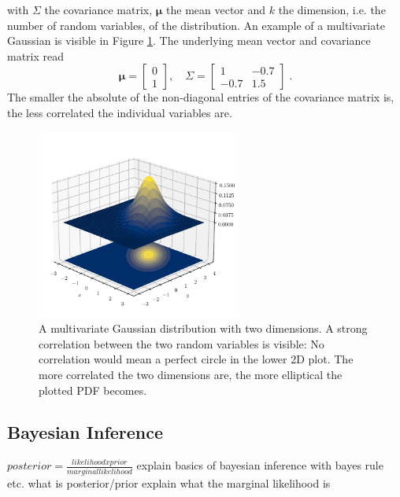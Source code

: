 \documentclass[%
  a4paper,oneside,%
  11pt,%
  smallchapters,
  style=printdev,
  extramargin,
  green,%
  rgb, <cmyk>
  ]{tubsbook}
\begin{document}
with $\Sigma$ the covariance matrix, $\bm{\mu}$ the mean vector and $k$ the dimension, i.e. the number of random variables, of the distribution.
An example of a multivariate Gaussian is visible in Figure \ref{fig:MultiGauss}. The underlying mean vector and covariance matrix read
\begin{equation}
\bm{\mu} = \begin{bmatrix}
           0 \\
           1
         \end{bmatrix}
, \quad     
\Sigma = \begin{bmatrix}
1 & -0.7 \\
-0.7 & 1.5 
\end{bmatrix} \;.
\end{equation}
The smaller the absolute of the non-diagonal entries of the covariance matrix is, the less correlated the individual variables are.

\begin{figure}[!ht]
\begin{center}
\includegraphics[width=0.6\textwidth]{pics/Gaussians}
\caption{A multivariate Gaussian distribution with two dimensions. A strong correlation between the two random variables is visible: No correlation would mean a perfect circle in the lower 2D plot. The more correlated the two dimensions are, the more elliptical the plotted PDF becomes. \cite{Virtanen2020} }
\label{fig:MultiGauss}
\end{center}
\end{figure}

\subsection{Bayesian Inference}
$posterior = \frac{likelihood x prior}{marginal likelihood}$ \cite{rasmussen2006}
explain basics of bayesian inference with bayes rule etc. what is posterior/prior 
explain what the marginal likelihood is
\end{document}
